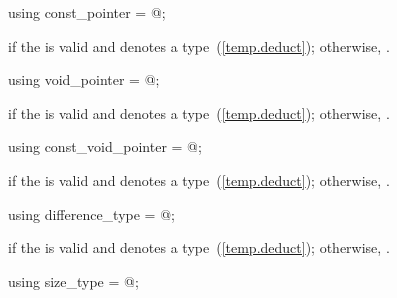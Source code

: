 %
\begin{itemdecl}
using const_pointer = @\seebelow@;
\end{itemdecl}

\begin{itemdescr}
\pnum
\ctype {} if
the   is valid and denotes a
type~(\ref{temp.deduct}); otherwise,
.
\end{itemdescr}

%
\begin{itemdecl}
using void_pointer = @\seebelow@;
\end{itemdecl}

\begin{itemdescr}
\pnum
\ctype {} if
the   is valid and denotes a
type~(\ref{temp.deduct}); otherwise,
.
\end{itemdescr}

%
\begin{itemdecl}
using const_void_pointer = @\seebelow@;
\end{itemdecl}

\begin{itemdescr}
\pnum
\ctype {} if
the   is valid and denotes a
type~(\ref{temp.deduct}); otherwise,
.
\end{itemdescr}

%
\begin{itemdecl}
using difference_type = @\seebelow@;
\end{itemdecl}

\begin{itemdescr}
\pnum
\ctype {} if
the   is valid and denotes a
type~(\ref{temp.deduct}); otherwise,
.
\end{itemdescr}

%
\begin{itemdecl}
using size_type = @\seebelow@;
\end{itemdecl}

